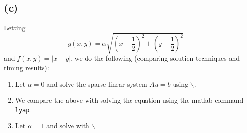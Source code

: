 \subsection*{(c)}
Letting
\begin{equation}
g(x,y) = \alpha\sqrt{(x-\frac{1}{2})^2+(y-\frac{1}{2})^2}
\end{equation}
and $f(x,y)= |x-y|$, we do the following (comparing solution techniques and timing results):
\begin{enumerate}
\item Let $\alpha = 0$ and solve the sparse linear system $Au = b$ using $\backslash$.
\item We compare the above with solving the equation using the matlab command \texttt{lyap}.
\item Let $\alpha = 1$ and solve with $\backslash$


\end{enumerate}
